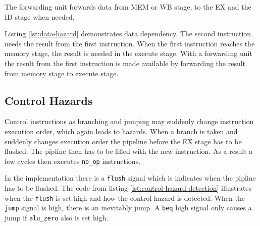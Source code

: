 The forwarding unit forwards data from MEM or WB stage, to the EX and the ID stage when needed.

Listing \ref{lst:data-hazard} demonstrates data dependency.
The second instruction needs the result from the first instruction.
When the first instruction reaches the memory stage, the result is needed in the execute stage.
With a forwarding unit the result from the first instruction is made available by forwarding the result from memory stage to execute stage.


\subsection{Control Hazards}
Control instructions as branching and jumping may suddenly change instruction execution order,
which again leads to hazards.
When a branch is taken and suddenly changes execution order the pipeline before the EX stage has to be flushed.
The pipline then has to be filled with the new instruction.
As a result a few cycles then executes \texttt{no\_op} instructions.

In the implementation there is a \texttt{flush} signal which is indicates when the pipline has to be flushed.
The code from listing \ref{lst:control-hazard-detection} illustrates when the \texttt{flush} is set high and how the control hazard is detected.
When the \texttt{jump} signal is high, there is an inevitably jump.
A \texttt{beq} high signal only causes a jump if \texttt{alu\_zero} also is set high.


